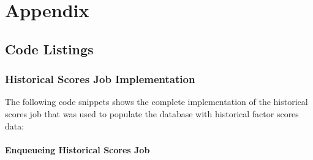 \documentclass[11pt,english,a4paper,hidelinks]{book}
\begin{document}
\part{Appendix}

\chapter{Code Listings}
\section{Historical Scores Job Implementation}
\label{app:historical_scores_job}

\noindent The following code snippets shows the complete implementation of the historical scores job that was used to populate the database with historical factor scores data:

\subsection{Enqueueing Historical Scores Job}
\end{document}
